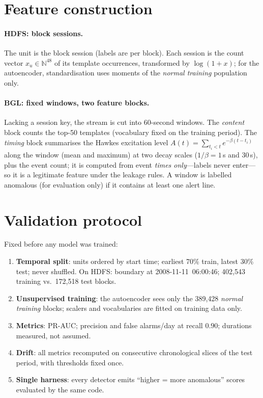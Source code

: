 \documentclass[11pt,a4paper]{report}
\begin{document}
\section{Feature construction}
\label{sec:method-features}
\paragraph{HDFS: block sessions.} The unit is the block session (labels are
per block). Each session is the count vector
$x_u\in\mathbb{N}^{48}$ of its template occurrences, transformed by
$\log(1{+}x)$; for the autoencoder, standardisation uses moments of the
\emph{normal training} population only.

\paragraph{BGL: fixed windows, two feature blocks.} Lacking a session key,
the stream is cut into 60-second windows. The \emph{content} block counts
the top-50 templates (vocabulary fixed on the training period). The
\emph{timing} block summarises the Hawkes excitation level
$A(t)=\sum_{t_i<t}e^{-\beta(t-t_i)}$ along the window (mean and maximum) at
two decay scales ($1/\beta=1$\,s and $30$\,s), plus the event count; it is
computed from event \emph{times only}---labels never enter---so it is a
legitimate feature under the leakage rules. A window is labelled anomalous
(for evaluation only) if it contains at least one alert line.

\section{Validation protocol}
\label{sec:validation-protocol}
Fixed before any model was trained:
\begin{enumerate}[nosep,leftmargin=1.6em]
  \item \textbf{Temporal split}: units ordered by start time; earliest 70\%
  train, latest 30\% test; never shuffled. On HDFS: boundary at
  2008-11-11~06:00:46; 402{,}543 training vs.\ 172{,}518 test blocks.
  \item \textbf{Unsupervised training}: the autoencoder sees only the
  389{,}428 \emph{normal training} blocks; scalers and vocabularies are
  fitted on training data only.
  \item \textbf{Metrics}: PR-AUC; precision and false alarms/day at recall
  $0.90$; durations measured, not assumed.
  \item \textbf{Drift}: all metrics recomputed on consecutive chronological
  slices of the test period, with thresholds fixed once.
  \item \textbf{Single harness}: every detector emits ``higher = more
  anomalous'' scores evaluated by the same code.
\end{enumerate}
\end{document}
